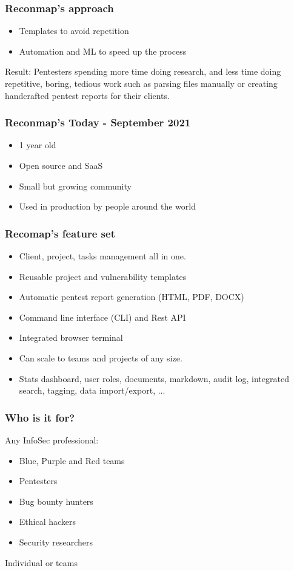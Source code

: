 \documentclass{beamer}
\begin{document}
\begin{frame}
	\frametitle{Reconmap's approach}
	
	\begin{itemize}
		\item Templates to avoid repetition
		\item Automation and ML to speed up the process
	\end{itemize}
	
	\begin{block}{Result:}
		Pentesters spending more time doing research, and less time doing repetitive, boring, tedious work such as parsing files manually or creating handcrafted pentest reports for their clients.	
	\end{block}
\end{frame}


\begin{frame}
	\frametitle{Reconmap's Today - September 2021}
	
	\begin{itemize}
		\item 1 year old
		\item Open source and SaaS
		\item Small but growing community
		\item Used in production by people around the world
	\end{itemize}
\end{frame}

\begin{frame}{}
	\frametitle{Recomap's feature set}
	
    \begin{itemize}
        \item Client, project, tasks management all in one.
        \item Reusable project and vulnerability templates
        \item Automatic pentest report generation (HTML, PDF, DOCX)
        \item Command line interface (CLI) and Rest API
        \item Integrated browser terminal
        \item Can scale to teams and projects of any size.
        \item Stats dashboard, user roles, documents, markdown, audit log, integrated search, tagging, data import/export, ...
    \end{itemize}
\end{frame}

\begin{frame}
	\frametitle{Who is it for?}
	
	Any InfoSec professional:
	\begin{itemize}
		\item Blue, Purple and Red teams
		\item Pentesters
		\item Bug bounty hunters
		\item Ethical hackers
		\item Security researchers
	\end{itemize}
	
	Individual or teams
\end{frame}
\end{document}
